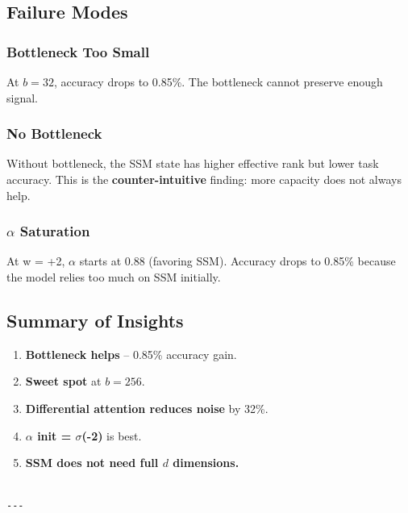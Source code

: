\subsection{Failure Modes}

\subsubsection{Bottleneck Too Small}

At $b = 32$, accuracy drops to 0.85\%. The bottleneck cannot preserve 
enough signal.

\subsubsection{No Bottleneck}

Without bottleneck, the SSM state has higher effective rank but lower 
task accuracy. This is the \textbf{counter-intuitive} finding: more capacity 
does not always help.

\subsubsection{$\alpha$ Saturation}

At w  = +2, $\alpha$ starts at 0.88 (favoring SSM). Accuracy drops to 0.85\% 
because the model relies too much on SSM initially.

\subsection{Summary of Insights}

\begin{enumerate}
\item \textbf{Bottleneck helps} -- 0.85\% accuracy gain.
\item \textbf{Sweet spot} at $b = 256$.
\item \textbf{Differential attention reduces noise} by 32\%.
\item \textbf{$\alpha$ init = $\sigma$(-2)} is best.
\item \textbf{SSM does not need full $d$ dimensions.}
\end{enumerate}
\begin{lstlisting}

---
\end{lstlisting}